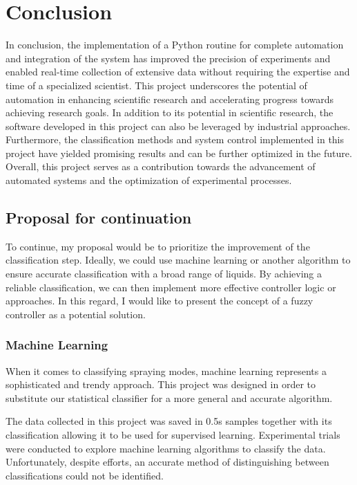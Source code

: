 \chapter{Conclusion}
\label{chap:conclusion}

In conclusion, the implementation of a Python routine for complete automation and integration of the system has improved the precision of experiments and enabled real-time collection of extensive data without requiring the expertise and time of a specialized scientist. 
This project underscores the potential of automation in enhancing scientific research and accelerating progress towards achieving research goals.
In addition to its potential in scientific research, the software developed in this project can also be leveraged by industrial approaches. 
Furthermore, the classification methods and system control implemented in this project have yielded promising results and can be further optimized in the future. Overall, this project serves as a contribution towards the advancement of automated systems and the optimization of experimental processes.

\section{Proposal for continuation}

To continue, my proposal would be to prioritize the improvement of the classification step. 
Ideally, we could use machine learning or another algorithm to ensure accurate classification with a broad range of liquids.
By achieving a reliable classification, we can then implement more effective controller logic or approaches. 
In this regard, I would like to present the concept of a fuzzy controller as a potential solution.

\subsection{Machine Learning}

    When it comes to classifying spraying modes, machine learning represents a sophisticated and trendy approach.
    This project was designed in order to substitute our statistical classifier for a more general and accurate algorithm.
    
    The data collected in this project was saved in 0.5s samples together with its classification allowing it to be used for supervised learning.
    Experimental trials were conducted to explore machine learning algorithms to classify the data. Unfortunately, despite efforts, an accurate method of distinguishing between classifications could not be identified.

